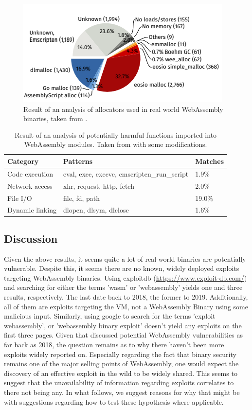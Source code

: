\documentclass[sigconf]{acmart}
\begin{document}
\begin{figure}[h]
  \centering
  \includegraphics[scale=1]{analysis_used_alloc}
  \caption{Result of an analysis of allocators used in real world WebAssembly binaries, taken from \cite{hilbig_empirical_2021}.}  
\label{fig:analysis_used_alloc}
\end{figure}

\begin{table}
\label{table:analysis_import_harmful_functions}
\caption{Result of an analysis of potentially harmful functions imported into WebAssembly modules. Taken from \cite{hilbig_empirical_2021} with some modifications.}
\begin{tabular}{l|l|l}
  \toprule
  Category & Patterns & Matches\\
  \midrule
  Code execution & eval, exec, execve, emscripten\_run\_script & 1.9\% \\ \hline
  Network access & xhr, request, http, fetch & 2.0\% \\ \hline
  File I/O  & file, fd, path & 19.0\% \\ \hline
  Dynamic linking & dlopen, dlsym, dlclose  & 1.6\%
\end{tabular}
\end{table}

\subsection{Discussion}
Given the above results, it seems quite a lot of real-world binaries are potentially vulnerable. Despite this, it seems there are no known, widely deployed exploits targeting WebAssembly binaries. Using exploitdb (\url{https://www.exploit-db.com/}) and searching for either the terms 'wasm' or 'webassembly' yields one and three results, respectively. The last date back to 2018, the former to 2019. Additionally, all of them are exploits targeting the VM, not a WebAssembly Binary using some malicious input. Similarly, using google to search for the terms 'exploit webassembly', or 'webassembly binary exploit' doesn't yield any exploits on the first three pages. Given that \cite{mcfadden_security_2018} discussed potential WebAssembly vulnerabilities as far back as 2018, the question remains as to why there haven't been more exploits widely reported on. Especially regarding the fact that binary security remains one of the major selling points of WebAssembly, one would expect the discovery of an effective exploit in the wild to be widely shared. This seems to suggest that the unavailability of information regarding exploits correlates to there not being any. In what follows, we suggest reasons for why that might be with suggestions regarding how to test these hypothesis where applicable.
\end{document}
